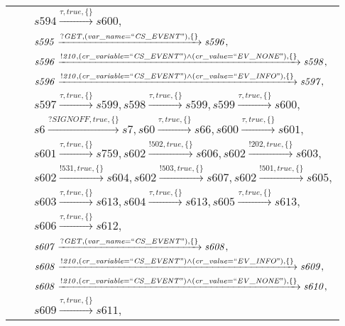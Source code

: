 \begin{tabular}{lcl}
& & $\mathit{s594}\xrightarrow{\mathit{\tau}, \mathit{true}, \{\}}\mathit{s600},$ \\
& & $\mathit{s595}\xrightarrow{\mathit{?GET}, \mathit{(var\_name = ``CS\_EVENT")}, \{\}}\mathit{s596},$ \\
& & $\mathit{s596}\xrightarrow{\mathit{!210}, \mathit{(cr\_variable = ``CS\_EVENT") \land (cr\_value = ``EV\_NONE")}, \{\}}\mathit{s598},$ \\
& & $\mathit{s596}\xrightarrow{\mathit{!210}, \mathit{(cr\_variable = ``CS\_EVENT") \land (cr\_value = ``EV\_INFO")}, \{\}}\mathit{s597},$ \\
& & $\mathit{s597}\xrightarrow{\mathit{\tau}, \mathit{true}, \{\}}\mathit{s599},\mathit{s598}\xrightarrow{\mathit{\tau}, \mathit{true}, \{\}}\mathit{s599},\mathit{s599}\xrightarrow{\mathit{\tau}, \mathit{true}, \{\}}\mathit{s600},$ \\
& & $\mathit{s6}\xrightarrow{\mathit{?SIGNOFF}, \mathit{true}, \{\}}\mathit{s7},\mathit{s60}\xrightarrow{\mathit{\tau}, \mathit{true}, \{\}}\mathit{s66},\mathit{s600}\xrightarrow{\mathit{\tau}, \mathit{true}, \{\}}\mathit{s601},$ \\
& & $\mathit{s601}\xrightarrow{\mathit{\tau}, \mathit{true}, \{\}}\mathit{s759},\mathit{s602}\xrightarrow{\mathit{!502}, \mathit{true}, \{\}}\mathit{s606},\mathit{s602}\xrightarrow{\mathit{!202}, \mathit{true}, \{\}}\mathit{s603},$ \\
& & $\mathit{s602}\xrightarrow{\mathit{!531}, \mathit{true}, \{\}}\mathit{s604},\mathit{s602}\xrightarrow{\mathit{!503}, \mathit{true}, \{\}}\mathit{s607},\mathit{s602}\xrightarrow{\mathit{!501}, \mathit{true}, \{\}}\mathit{s605},$ \\
& & $\mathit{s603}\xrightarrow{\mathit{\tau}, \mathit{true}, \{\}}\mathit{s613},\mathit{s604}\xrightarrow{\mathit{\tau}, \mathit{true}, \{\}}\mathit{s613},\mathit{s605}\xrightarrow{\mathit{\tau}, \mathit{true}, \{\}}\mathit{s613},$ \\
& & $\mathit{s606}\xrightarrow{\mathit{\tau}, \mathit{true}, \{\}}\mathit{s612},$ \\
& & $\mathit{s607}\xrightarrow{\mathit{?GET}, \mathit{(var\_name = ``CS\_EVENT")}, \{\}}\mathit{s608},$ \\
& & $\mathit{s608}\xrightarrow{\mathit{!210}, \mathit{(cr\_variable = ``CS\_EVENT") \land (cr\_value = ``EV\_INFO")}, \{\}}\mathit{s609},$ \\
& & $\mathit{s608}\xrightarrow{\mathit{!210}, \mathit{(cr\_variable = ``CS\_EVENT") \land (cr\_value = ``EV\_NONE")}, \{\}}\mathit{s610},$ \\
& & $\mathit{s609}\xrightarrow{\mathit{\tau}, \mathit{true}, \{\}}\mathit{s611},$ \\
\end{tabular}

